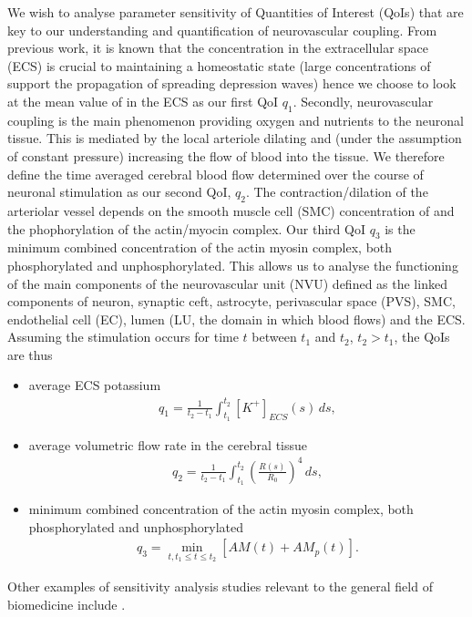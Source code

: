  We wish to analyse parameter sensitivity of Quantities of Interest (QoIs) that are key to our understanding and quantification of  neurovascular coupling.   From previous work, it is known that the \pot concentration in the extracellular space (ECS) is crucial to maintaining a homeostatic state (large concentrations of \pot support the propagation of spreading depression waves) hence we choose to look at the mean value of \pot in the ECS as our first QoI $q_1$. Secondly, neurovascular coupling is the main phenomenon providing oxygen and nutrients to the neuronal tissue. This is mediated by the local arteriole dilating and (under the assumption of constant pressure) increasing the flow of blood into the tissue. We therefore define the time averaged cerebral blood flow determined over the course of neuronal stimulation as our second QoI, $q_2$. The contraction/dilation of the arteriolar vessel  depends on the smooth muscle cell (SMC) concentration of \ca and the phophorylation of the actin/myocin complex. Our third QoI $q_3$ is the minimum combined concentration of the actin myosin complex, both phosphorylated and unphosphorylated. This allows us to analyse the functioning of the main components of the neurovascular unit (NVU) defined as the linked components of neuron, synaptic ceft, astrocyte, perivascular space (PVS), SMC, endothelial cell (EC), lumen (LU, the domain in which blood flows) and the ECS. 
  Assuming the stimulation occurs for time $t$ between $t_1$ and $t_2$, $t_2>t_1$,  the QoIs are thus
 \begin{itemize}
\item average ECS potassium 
\begin{eqnarray}
 q_1 = \frac{1}{t_2-t_1}\int_{t_1}^{t_2}[K^+]_{ECS}(s)\, ds, \label{K_ECS_Mean}
\end{eqnarray}
\item average volumetric flow rate in the cerebral tissue
\begin{eqnarray}
 q_2 = \frac{1}{t_2-t_1}\int_{t_1}^{t_2}\left(\frac{R(s)}{R_0}\right)^4\, ds, \label{vol_flow}
\end{eqnarray}
 \item minimum combined concentration of the actin myosin complex, both phosphorylated and unphosphorylated
\begin{eqnarray}
q_3 = \min _{t, t_1\le t \le t_2} [AM(t)+AM_p(t)]. \label{AM_AMp_Min}
\end{eqnarray}
\end{itemize}

Other examples of sensitivity analysis studies relevant to the general field of biomedicine include \cite{gsa_pharm,lr_gsa,uqpy,Witthoft2013}.
